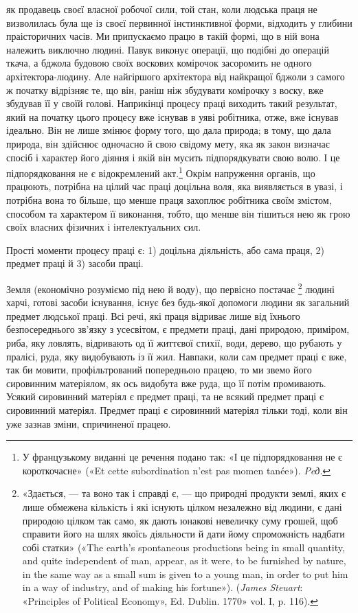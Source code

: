 \parcont{}  %
як продавець своєї власної робочої сили, той стан, коли людська
праця не визволилась була ще із своєї первинної інстинктивної
форми, відходить у глибини праісторичних часів. Ми припускаємо
працю в такій формі, що в ній вона належить виключно людині.
Павук виконує операції, що подібні до операцій ткача, а бджола
будовою своїх воскових комірочок засоромить не одного архітектора-людину.
Але найгіршого архітектора від найкращої
бджоли з самого ж початку відрізняє те, що він, раніш ніж збудувати
комірочку з воску, вже збудував її у своїй голові. Наприкінці
процесу праці виходить такий результат, який на початку
цього процесу вже існував в уяві робітника, отже, вже
існував ідеально. Він не лише змінює форму того, що дала природа;
в тому, що дала природа, він здійснює одночасно й свою
свідому мету, яка як закон визначає спосіб і характер його діяння
і якій він мусить підпорядкувати свою волю. І це підпорядковання
не є відокремлений акт.\footnote*{
У французькому виданні це речення подано так: «І це підпорядковання
не є короткочасне» («Et cette subordination n’est pas momen
tanée»). \emph{Peд}.
} Окрім напруження органів, що працюють,
потрібна на цілий час праці доцільна воля, яка виявляється
в увазі, і потрібна вона то більше, що менше праця захоплює
робітника своїм змістом, способом та характером її виконання,
тобто, що менше він тішиться нею як грою своїх власних
фізичних і інтелектуальних сил.

Прості моменти процесу праці є: 1) доцільна діяльність, або
сама праця, 2) предмет праці й 3) засоби праці.

Земля (економічно розуміємо під нею й воду), що первісно
постачає \footnote{«Здається, — та воно так і справді є, — що природні продукти
землі, яких є лише обмежена кількість і які існують цілком незалежно
від людини, є дані природою цілком так само, як дають юнакові невеличку
суму грошей, щоб справити його на шлях якоїсь діяльности й дати йому
спроможність надбати собі статки» («The earth’s spontaneous productions
being in small quantity, and quite independent of man, appear,
as it were, to be furnished by nature, in the same way as a small sum is given
to a young man, in order to put him in a way of industry, and of making
his fortune»). (\emph{James Steuart}: «Principles of Political Economy», Ed.
Dublin. 1770» vol. I, p. 116).}
людині харчі, готові засоби існування, існує без будь-якої
допомоги людини як загальний предмет людської праці.
Всі речі, які праця відриває лише від їхнього безпосереднього
зв’язку з усесвітом, є предмети праці, дані природою, приміром,
риба, яку ловлять, відривають од її життєвої стихії, води, дерево,
що рубають у пралісі, руда, яку видобувають із її жил. Навпаки, коли сам предмет праці є вже, так би мовити, профільтрований
попередньою працею, то ми звемо його сировинним матеріялом,
як ось видобута вже руда, що її потім промивають. Усякий сировинний
матеріял є предмет праці, та не всякий предмет праці є
сировинний матеріял. Предмет праці є сировинний матеріял тільки
тоді, коли він уже зазнав зміни, спричиненої працею.

